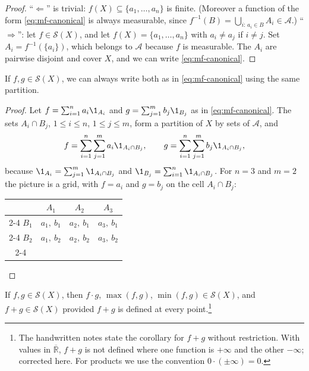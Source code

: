 \begin{proof}
``$\Leftarrow$'' is trivial: $f(X)\subseteq\{a_1,\dots,a_n\}$ is finite. (Moreover a function
of the form \eqref{eq:mf-canonical} is always measurable, since
$f^{-1}(B)=\bigcup_{i:\,a_i\in B}A_i\in\mathcal A$.) ``$\Rightarrow$'': let $f\in\mathcal S(X)$,
and let $f(X)=\{a_1,\dots,a_n\}$ with $a_i\ne a_j$ if $i\ne j$. Set $A_i=f^{-1}(\{a_i\})$,
which belongs to $\mathcal A$ because $f$ is measurable. The $A_i$ are pairwise disjoint and
cover $X$, and we can write \eqref{eq:mf-canonical}.
\end{proof}

\begin{proposition}\label{prop:mf-common-partition}
If $f,g\in\mathcal S(X)$, we can always write both as in \eqref{eq:mf-canonical} using the same
partition.
\end{proposition}

\begin{proof}
Let $f=\sum_{i=1}^na_i\1_{A_i}$ and $g=\sum_{j=1}^mb_j\1_{B_j}$ as in
\eqref{eq:mf-canonical}. The sets $A_i\cap B_j$, $1\le i\le n$, $1\le j\le m$, form a partition
of $X$ by sets of $\mathcal A$, and
\[
  f=\sum_{i=1}^n\sum_{j=1}^ma_i\1_{A_i\cap B_j},\qquad
  g=\sum_{i=1}^n\sum_{j=1}^mb_j\1_{A_i\cap B_j},
\]
because $\1_{A_i}=\sum_{j=1}^m\1_{A_i\cap B_j}$ and
$\1_{B_j}=\sum_{i=1}^n\1_{A_i\cap B_j}$. For $n=3$ and $m=2$ the picture is a grid,
with $f=a_i$ and $g=b_j$ on the cell $A_i\cap B_j$:
\begin{center}
\small
\begin{tabular}{c|c|c|c|}
  \multicolumn{1}{c}{} & \multicolumn{1}{c}{$A_1$} & \multicolumn{1}{c}{$A_2$} & \multicolumn{1}{c}{$A_3$}\\
  \cline{2-4}
  $B_1$ & $a_1,\ b_1$ & $a_2,\ b_1$ & $a_3,\ b_1$\\
  \cline{2-4}
  $B_2$ & $a_1,\ b_2$ & $a_2,\ b_2$ & $a_3,\ b_2$\\
  \cline{2-4}
\end{tabular}
\end{center}
\vspace{-1.2em}
\end{proof}

\begin{corollary}\label{cor:mf-simple-operations}
If $f,g\in\mathcal S(X)$, then $f\cdot g$, $\max(f,g)$, $\min(f,g)\in\mathcal S(X)$, and
$f+g\in\mathcal S(X)$ provided $f+g$ is defined at every point.\footnote{The handwritten notes
state the corollary for $f+g$ without restriction. With values in $\overline{\mathbb R}$, $f+g$
is not defined where one function is $+\infty$ and the other $-\infty$; corrected here. For
products we use the convention $0\cdot(\pm\infty)=0$.}
\end{corollary}

